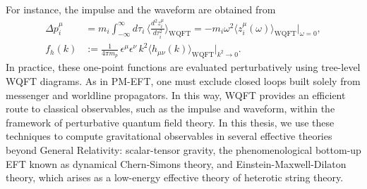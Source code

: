 For instance, the impulse and the waveform are obtained from
\begin{equation}
\begin{split}
    \Delta p_i^\mu
    &=
    m_i \int_{-\infty}^{\infty} d\tau_i\,
    \Big\langle \frac{d^2 z_i^\mu}{d\tau_i^2}\Big\rangle_{\text{WQFT}}
    =
    -m_i\omega^2\langle z_i^\mu(\omega)\rangle_{\text{WQFT}}\Big|_{\omega=0},\\
    f_h(k)
    &:=
    \frac{1}{4\pi m_p}\,
    \epsilon^\mu\epsilon^\nu\,
    k^2\langle h_{\mu\nu}(k)\rangle_{\textrm{WQFT}}\Big|_{k^2\to 0}.
\end{split}
\end{equation}
In practice, these one-point functions are evaluated perturbatively using tree-level WQFT diagrams. As in PM-EFT, one must exclude closed loops built solely from messenger and worldline propagators. In this way, WQFT provides an efficient route to classical observables, such as the impulse and waveform, within the framework of perturbative quantum field theory. In this thesis, we use these techniques to compute gravitational observables in several effective theories beyond General Relativity: scalar-tensor gravity, the phenomenological bottom-up EFT known as dynamical Chern-Simons theory, and Einstein-Maxwell-Dilaton theory, which arises as a low-energy effective theory of heterotic string theory.

